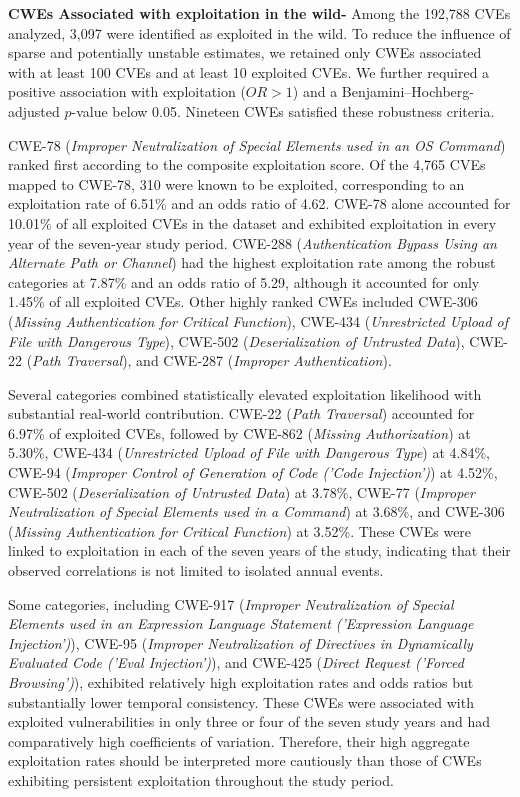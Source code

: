 \documentclass[conference,compsoc]{IEEEtran}
\begin{document}
\textbf{CWEs Associated with exploitation in the wild-} Among the 192,788 CVEs analyzed, 3,097 were identified as exploited in the wild. To reduce the influence of sparse and potentially unstable estimates, we retained only CWEs associated with at least 100 CVEs and at least 10 exploited CVEs. We further required a positive association with exploitation ($OR>1$) and a Benjamini--Hochberg-adjusted $p$-value below 0.05. Nineteen CWEs satisfied these robustness criteria.

CWE-78 (\emph{Improper Neutralization of Special Elements used in an OS Command}) ranked first according to the composite exploitation score. Of the 4,765 CVEs mapped to CWE-78, 310 were known to be exploited, corresponding to an exploitation rate of 6.51\% and an odds ratio of 4.62. CWE-78 alone accounted for 10.01\% of all exploited CVEs in the dataset and exhibited exploitation in every year of the seven-year study period. CWE-288 (\emph{Authentication Bypass Using an Alternate Path or Channel}) had the highest exploitation rate among the robust categories at 7.87\% and an odds ratio of 5.29, although it accounted for only 1.45\% of all exploited CVEs. Other highly ranked CWEs included CWE-306 (\emph{Missing Authentication for Critical Function}), CWE-434 (\emph{Unrestricted Upload of File with Dangerous Type}), CWE-502 (\emph{Deserialization of Untrusted Data}), CWE-22 (\emph{Path Traversal}), and CWE-287 (\emph{Improper Authentication}).

Several categories combined statistically elevated exploitation likelihood with substantial real-world contribution. CWE-22 (\emph{Path Traversal}) accounted for 6.97\% of exploited CVEs, followed by CWE-862 (\emph{Missing Authorization}) at 5.30\%, CWE-434 (\emph{Unrestricted Upload of File with Dangerous Type}) at 4.84\%, CWE-94 (\emph{Improper Control of Generation of Code ('Code Injection')}) at 4.52\%, CWE-502 (\emph{Deserialization of Untrusted Data}) at 3.78\%, CWE-77 (\emph{Improper Neutralization of Special Elements used in a Command}) at 3.68\%, and CWE-306 (\emph{Missing Authentication for Critical Function}) at 3.52\%. These CWEs were linked to exploitation in each of the seven years of the study, indicating that their observed correlations is not limited to isolated annual events.

Some categories, including CWE-917 (\emph{Improper Neutralization of Special Elements used in an Expression Language Statement ('Expression Language Injection')}), CWE-95 (\emph{Improper Neutralization of Directives in Dynamically Evaluated Code ('Eval Injection')}), and CWE-425 (\emph{Direct Request ('Forced Browsing')}), exhibited relatively high exploitation rates and odds ratios but substantially lower temporal consistency. These CWEs were associated with exploited vulnerabilities in only three or four of the seven study years and had comparatively high coefficients of variation. Therefore, their high aggregate exploitation rates should be interpreted more cautiously than those of CWEs exhibiting persistent exploitation throughout the study period.
\end{document}
